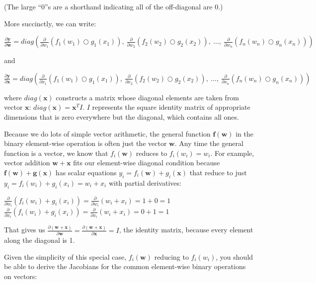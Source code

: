 \documentclass[11pt]{article}
\begin{document}
(The large ``0''s are a shorthand indicating all of the off-diagonal are 0.)

More succinctly, we can write:

$\frac{\partial \mathbf{y}}{\partial \mathbf{w}} = diag \left( \frac{\partial}{\partial w_1}(f_{1}(w_1) \bigcirc g_{1}(x_1)),~ \frac{\partial}{\partial w_2}(f_{2}(w_2) \bigcirc g_{2}(x_2)),~ \ldots,~ \frac{\partial}{\partial w_n}(f_{n}(w_n) \bigcirc g_{n}(x_n)) \right)$

and

$\frac{\partial \mathbf{y}}{\partial \mathbf{x}} = diag \left( \frac{\partial}{\partial x_1}(f_{1}(w_1) \bigcirc g_{1}(x_1)),~ \frac{\partial}{\partial x_2}(f_{2}(w_2) \bigcirc g_{2}(x_2)),~ \ldots,~ \frac{\partial}{\partial x_n}(f_{n}(w_n) \bigcirc g_{n}(x_n)) \right)$

where $diag(\mathbf{x})$ constructs a matrix whose diagonal elements are taken from vector $\mathbf{x}$: $diag(\mathbf{x}) = \mathbf{x}^T I$. $I$ represents the square identity matrix of appropriate dimensions that is zero everywhere but the diagonal, which contains all ones.

Because we do lots of simple vector arithmetic, the general function $\mathbf{f(w)}$ in the binary element-wise operation is often just the vector $\mathbf{w}$.  Any time the general function is a vector, we know that $f_i(\mathbf{w})$ reduces to $f_i(w_i) = w_i$. For example, vector addition $\mathbf{w + x}$ fits our element-wise diagonal condition because $\mathbf{f(w)} + \mathbf{g(x)}$ has scalar equations $y_i = f_i(\mathbf{w}) + g_i(\mathbf{x})$ that reduce to just $y_i = f_i(w_i) + g_i(x_i) = w_i + x_i$ with partial derivatives:

$\frac{\partial}{\partial w_i} ( f_{i}(w_i) + g_{i}(x_i) ) = \frac{\partial}{\partial w_i}(w_i + x_i) = 1 + 0 = 1$\\
$\frac{\partial}{\partial x_i} ( f_{i}(w_i) + g_{i}(x_i) ) = \frac{\partial}{\partial x_i}(w_i + x_i) = 0 + 1 = 1$

That gives us $\frac{\partial (\mathbf{w+x})}{\partial \mathbf{w}} = \frac{\partial (\mathbf{w+x})}{\partial \mathbf{x}} = I$, the identity matrix, because every element along the diagonal is 1.

Given the simplicity of this special case, $f_i(\mathbf{w})$ reducing to $f_i(w_i)$, you should be able to derive the Jacobians for the common element-wise binary operations on vectors:
\end{document}
